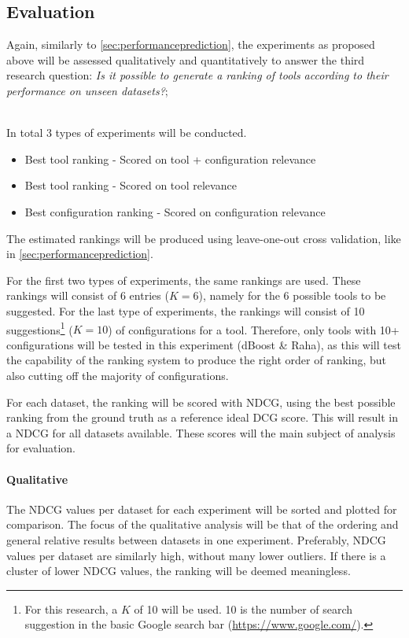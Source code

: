 \subsection{Evaluation}
Again, similarly to \autoref{sec:performanceprediction}, the experiments as proposed above will be assessed qualitatively and quantitatively to answer the third research question: \textit{Is it possible to generate a ranking of tools according to their performance on unseen datasets?}; 

~\\In total 3 types of experiments will be conducted. 
\begin{itemize}
    \item Best tool ranking - Scored on tool + configuration relevance
    \item Best tool ranking - Scored on tool relevance
    \item Best configuration ranking - Scored on configuration relevance
\end{itemize}

The estimated rankings will be produced using leave-one-out cross validation, like in \autoref{sec:performanceprediction}. 

For the first two types of experiments, the same rankings are used. These rankings will consist of 6 entries ($K = 6$), namely for the 6 possible tools to be suggested. 
For the last type of experiments, the rankings will consist of 10 suggestions\footnote{For this research, a $K$ of 10 will be used. 10 is the number of search suggestion in the basic Google search bar (\url{https://www.google.com/}).} ($K = 10$) of configurations for a tool. Therefore, only tools with 10+ configurations will be tested in this experiment (dBoost \& Raha), as this will test the capability of the ranking system to produce the right order of ranking, but also cutting off the majority of configurations.

For each dataset, the ranking will be scored with NDCG, using the best possible ranking from the ground truth as a reference ideal DCG score. This will result in a NDCG for all datasets available. These scores will the main subject of analysis for evaluation.

\paragraph{Qualitative} The NDCG values per dataset for each experiment will be sorted and plotted for comparison. The focus of the qualitative analysis will be that of the ordering and general relative results between datasets in one experiment. Preferably, NDCG values per dataset are similarly high, without many lower outliers. If there is a cluster of lower NDCG values, the ranking will be deemed meaningless.

